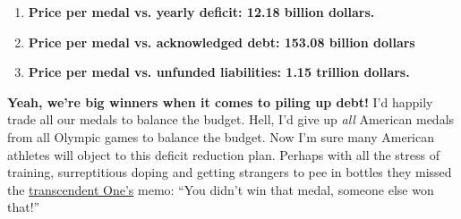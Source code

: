\begin{enumerate}
\item
  \textbf{Price per medal vs. yearly deficit: 12.18 billion dollars.}
\item
  \textbf{Price per medal vs. acknowledged debt: 153.08 billion dollars}
\item
  \textbf{Price per medal vs. unfunded liabilities: 1.15 trillion
  dollars.}
\end{enumerate}
\textbf{Yeah, we're big winners when it comes to piling up debt!} I'd
happily trade all our medals to balance the budget. Hell, I'd give up \emph{all}
American medals from all Olympic games to balance the budget.
Now I'm sure many American athletes will object to this deficit
reduction plan. Perhaps
with all the stress of training, surreptitious doping and getting strangers
to pee in bottles they missed the 
\href{http://www.youtube.com/watch?v=YKjPI6no5ng}{transcendent One's} memo:
``You didn't win that medal, someone else won that!''




%